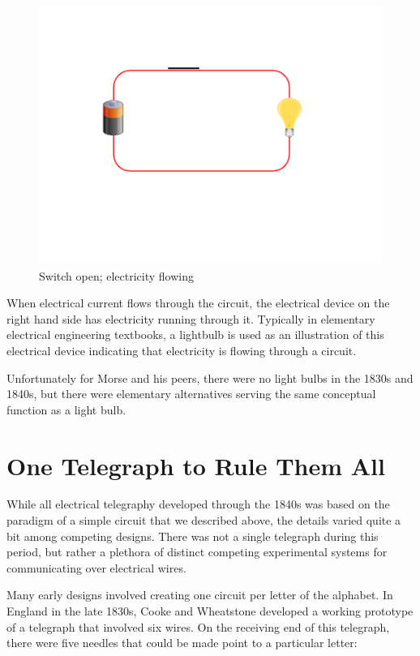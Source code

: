\documentclass[UTF8]{book}
\begin{document}
\begin{CJK}{UTF8}{gbsn}
\begin{figure}[H]
\centering
\includegraphics[width=0.8\linewidth]{circuit2}
\caption{Switch open; electricity flowing}
\end{figure}

When electrical current flows through the circuit, the electrical device on the right hand side has electricity running through it. Typically in elementary electrical engineering textbooks, a lightbulb is used as an illustration of this electrical device indicating that electricity is flowing through a circuit.

Unfortunately for Morse and his peers, there were no light bulbs in the 1830s and 1840s, but there were elementary alternatives serving the same conceptual function as a light bulb.

\section{One Telegraph to Rule Them All}

While all electrical telegraphy developed through the 1840s was based on the paradigm of a simple circuit that we described above, the details varied quite a bit among competing designs. There was not a single telegraph during this period, but rather a plethora of distinct competing experimental systems for communicating over electrical wires.

Many early designs involved creating one circuit per letter of the alphabet. In England in the late 1830s, Cooke and Wheatstone developed a working prototype of a telegraph that involved six wires. On the receiving end of this telegraph, there were five needles that could be made point to a particular letter:


\end{CJK}
\end{document}
